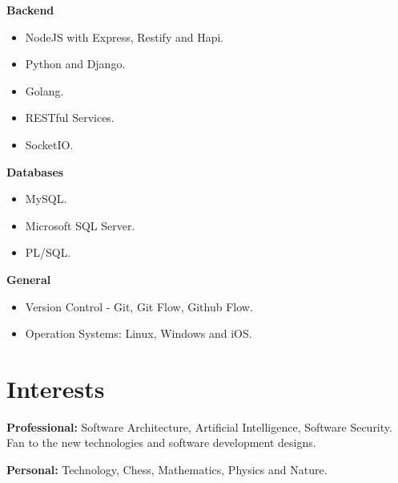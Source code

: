\documentclass[]{friggeri-cv} %
\begin{document}
\textbf{Backend}
\begin{itemize}
	\item NodeJS with Express, Restify and Hapi.
	\item Python and Django.
	\item Golang.
	\item RESTful Services.
	\item SocketIO.
\end{itemize}

\textbf{Databases}
\begin{itemize}
	\item MySQL.
	\item Microsoft SQL Server.
	\item PL/SQL.
\end{itemize}

\textbf{General}
\begin{itemize}
	\item Version Control - Git, Git Flow, Github Flow.
	\item Operation Systems: Linux, Windows and iOS.
\end{itemize}


\section{Interests}

\textbf{Professional:} Software Architecture, Artificial Intelligence, Software Security. Fan to the new technologies and software development designs.

\textbf{Personal:} Technology, Chess, Mathematics, Physics and Nature.
\end{document}
